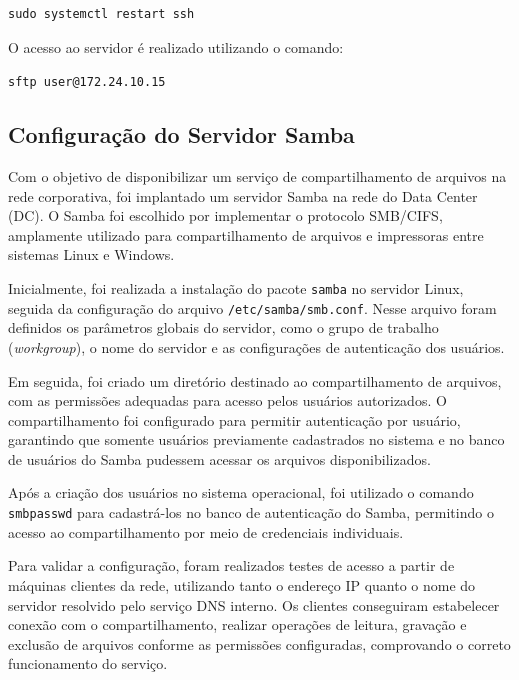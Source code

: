 \begin{listing}[H]
\centering
\begin{verbatim}
sudo systemctl restart ssh
\end{verbatim}
\caption{Reinicialização do serviço SSH.}
\label{lst:restartSSH}
\end{listing}

O acesso ao servidor é realizado utilizando o comando:

\begin{center}
\texttt{sftp user@172.24.10.15}
\end{center}



\subsection{Configuração do Servidor Samba}

Com o objetivo de disponibilizar um serviço de compartilhamento de arquivos na rede corporativa, foi implantado um servidor Samba na rede do Data Center (DC). O Samba foi escolhido por implementar o protocolo SMB/CIFS, amplamente utilizado para compartilhamento de arquivos e impressoras entre sistemas Linux e Windows.

Inicialmente, foi realizada a instalação do pacote \texttt{samba} no servidor Linux, seguida da configuração do arquivo \texttt{/etc/samba/smb.conf}. Nesse arquivo foram definidos os parâmetros globais do servidor, como o grupo de trabalho (\textit{workgroup}), o nome do servidor e as configurações de autenticação dos usuários.

Em seguida, foi criado um diretório destinado ao compartilhamento de arquivos, com as permissões adequadas para acesso pelos usuários autorizados. O compartilhamento foi configurado para permitir autenticação por usuário, garantindo que somente usuários previamente cadastrados no sistema e no banco de usuários do Samba pudessem acessar os arquivos disponibilizados.

Após a criação dos usuários no sistema operacional, foi utilizado o comando \texttt{smbpasswd} para cadastrá-los no banco de autenticação do Samba, permitindo o acesso ao compartilhamento por meio de credenciais individuais.

Para validar a configuração, foram realizados testes de acesso a partir de máquinas clientes da rede, utilizando tanto o endereço IP quanto o nome do servidor resolvido pelo serviço DNS interno. Os clientes conseguiram estabelecer conexão com o compartilhamento, realizar operações de leitura, gravação e exclusão de arquivos conforme as permissões configuradas, comprovando o correto funcionamento do serviço.

